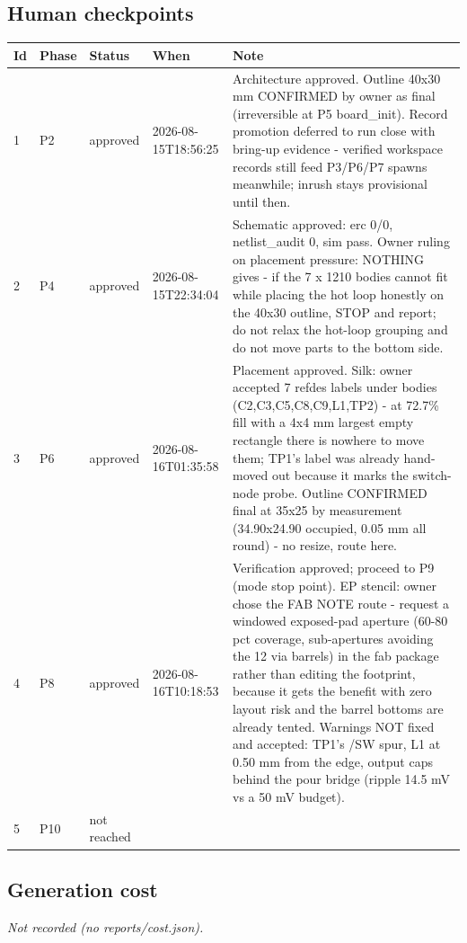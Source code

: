\documentclass[11pt,a4paper]{article}
\begin{document}
\subsection*{Human checkpoints}
{\small
\begin{longtable}{lllp{2.6cm}p{6.4cm}}
\toprule
\textbf{Id} & \textbf{Phase} & \textbf{Status} & \textbf{When} & \textbf{Note} \\
\midrule
\endhead
1 & P2 & approved & 2026-08-15T18:56:25 & Architecture approved. Outline 40x30 mm CONFIRMED by owner as final (irreversible at P5 board\_init). Record promotion deferred to run close with bring-up evidence - verified workspace records still feed P3/P6/P7 spawns meanwhile; inrush stays provisional until then. \\
2 & P4 & approved & 2026-08-15T22:34:04 & Schematic approved: erc 0/0, netlist\_audit 0, sim pass. Owner ruling on placement pressure: NOTHING gives - if the 7 x 1210 bodies cannot fit while placing the hot loop honestly on the 40x30 outline, STOP and report; do not relax the hot-loop grouping and do not move parts to the bottom side. \\
3 & P6 & approved & 2026-08-16T01:35:58 & Placement approved. Silk: owner accepted 7 refdes labels under bodies (C2,C3,C5,C8,C9,L1,TP2) - at 72.7\% fill with a 4x4 mm largest empty rectangle there is nowhere to move them; TP1's label was already hand-moved out because it marks the switch-node probe. Outline CONFIRMED final at 35x25 by measurement (34.90x24.90 occupied, 0.05 mm all round) - no resize, route here. \\
4 & P8 & approved & 2026-08-16T10:18:53 & Verification approved; proceed to P9 (mode stop point). EP stencil: owner chose the FAB NOTE route - request a windowed exposed-pad aperture (60-80 pct coverage, sub-apertures avoiding the 12 via barrels) in the fab package rather than editing the footprint, because it gets the benefit with zero layout risk and the barrel bottoms are already tented. Warnings NOT fixed and accepted: TP1's /SW spur, L1 at 0.50 mm from the edge, output caps behind the pour bridge (ripple 14.5 mV vs a 50 mV budget). \\
5 & P10 & not reached &  &  \\
\bottomrule
\end{longtable}
}
\subsection*{Generation cost}
\emph{Not recorded (no reports/cost.json).}
\end{document}
